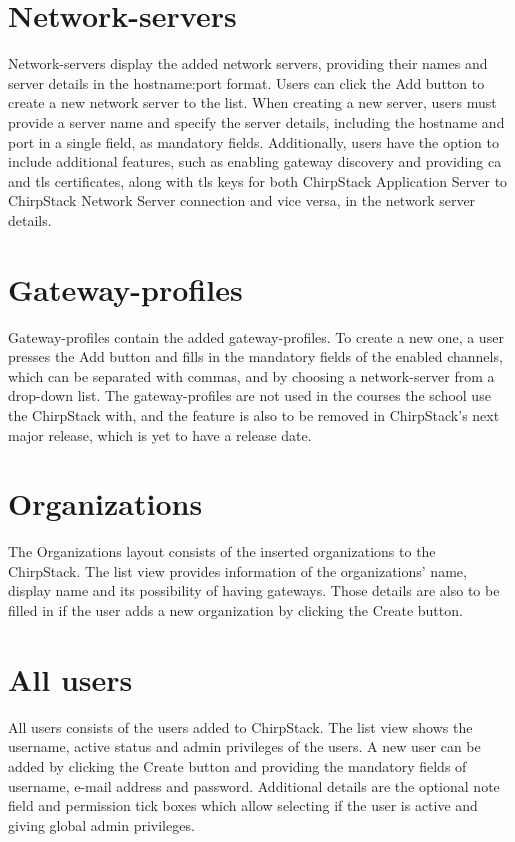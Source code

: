 \section{Network-servers}
Network-servers display the added network servers, providing their names and server details in the hostname:port format.
Users can click the Add button to create a new network server to the list.
When creating a new server, users must provide a server name and specify the server details, including the hostname and port in a single field, as mandatory fields.
Additionally, users have the option to include additional features, such as enabling gateway discovery and providing \gls{ca} and \gls{tls} certificates, along with \gls{tls} keys for both ChirpStack Application Server to ChirpStack Network Server connection and vice versa, in the network server details.

\section{Gateway-profiles}
Gateway-profiles contain the added gateway-profiles.
To create a new one, a user presses the Add button and fills in the mandatory fields of the enabled channels, which can be separated with commas, and by choosing a network-server from a drop-down list.
The gateway-profiles are not used in the courses the school use the ChirpStack with, and the feature is also to be removed in ChirpStack's next major release, which is yet to have a release date.

\section{Organizations}
The Organizations layout consists of the inserted organizations to the ChirpStack.
The list view provides information of the organizations' name, display name and its possibility of having gateways.
Those details are also to be filled in if the user adds a new organization by clicking the Create button.

\section{All users}
All users consists of the users added to ChirpStack.
The list view shows the username, active status and admin privileges of the users.
A new user can be added by clicking the Create button and providing the mandatory fields of username, e-mail address and password.
Additional details are the optional note field and permission tick boxes which allow selecting if the user is active and giving global admin privileges.


